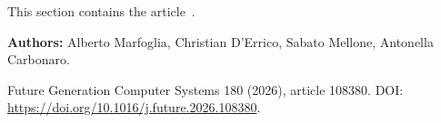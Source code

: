 
\noindent This section contains the article~\cite{MARFOGLIA2026108380}.

\begin{paperheader}
\textbf{Authors:} Alberto Marfoglia, Christian D'Errico, Sabato Mellone, Antonella Carbonaro.\par
Future Generation Computer Systems 180 (2026), article 108380. DOI: \url{https://doi.org/10.1016/j.future.2026.108380}.
\end{paperheader}

